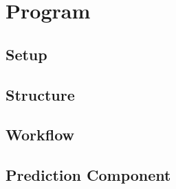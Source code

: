 \chapter{Program} \label{chapter:program}

\section{Setup}

\section{Structure}

\section{Workflow}

\section{Prediction Component}